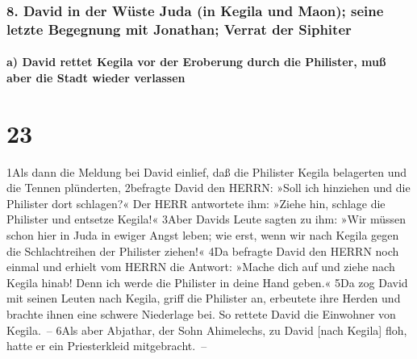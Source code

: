 \hypertarget{david-in-der-wuxfcste-juda-in-kegila-und-maon-seine-letzte-begegnung-mit-jonathan-verrat-der-siphiter}{%
\subsubsection{8. David in der Wüste Juda (in Kegila und Maon); seine
letzte Begegnung mit Jonathan; Verrat der
Siphiter}\label{david-in-der-wuxfcste-juda-in-kegila-und-maon-seine-letzte-begegnung-mit-jonathan-verrat-der-siphiter}}

\hypertarget{a-david-rettet-kegila-vor-der-eroberung-durch-die-philister-muuxdf-aber-die-stadt-wieder-verlassen}{%
\paragraph{a) David rettet Kegila vor der Eroberung durch die Philister,
muß aber die Stadt wieder
verlassen}\label{a-david-rettet-kegila-vor-der-eroberung-durch-die-philister-muuxdf-aber-die-stadt-wieder-verlassen}}

\hypertarget{section-22}{%
\section{23}\label{section-22}}

1Als dann die Meldung bei David einlief, daß die Philister Kegila
belagerten und die Tennen plünderten, 2befragte David den HERRN: »Soll
ich hinziehen und die Philister dort schlagen?« Der HERR antwortete ihm:
»Ziehe hin, schlage die Philister und entsetze Kegila!« 3Aber Davids
Leute sagten zu ihm: »Wir müssen schon hier in Juda in ewiger Angst
leben; wie erst, wenn wir nach Kegila gegen die Schlachtreihen der
Philister ziehen!« 4Da befragte David den HERRN noch einmal und erhielt
vom HERRN die Antwort: »Mache dich auf und ziehe nach Kegila hinab! Denn
ich werde die Philister in deine Hand geben.« 5Da zog David mit seinen
Leuten nach Kegila, griff die Philister an, erbeutete ihre Herden und
brachte ihnen eine schwere Niederlage bei. So rettete David die
Einwohner von Kegila.~-- 6Als aber Abjathar, der Sohn Ahimelechs, zu
David {[}nach Kegila{]} floh, hatte er ein Priesterkleid mitgebracht.~--

